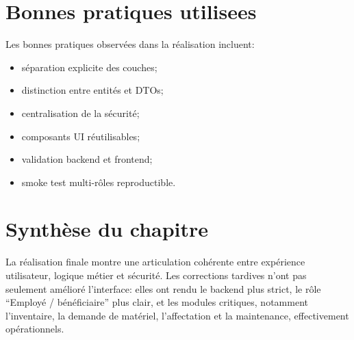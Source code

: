 \section{Bonnes pratiques utilisees}
Les bonnes pratiques observées dans la réalisation incluent:
\begin{itemize}
  \item séparation explicite des couches;
  \item distinction entre entités et DTOs;
  \item centralisation de la sécurité;
  \item composants UI réutilisables;
  \item validation backend et frontend;
  \item smoke test multi-rôles reproductible.
\end{itemize}

\section{Synthèse du chapitre}
La réalisation finale montre une articulation cohérente entre expérience utilisateur, logique métier et sécurité. Les corrections tardives n'ont pas seulement amélioré l'interface: elles ont rendu le backend plus strict, le rôle \enquote{Employé / bénéficiaire} plus clair, et les modules critiques, notamment l'inventaire, la demande de matériel, l'affectation et la maintenance, effectivement opérationnels.









